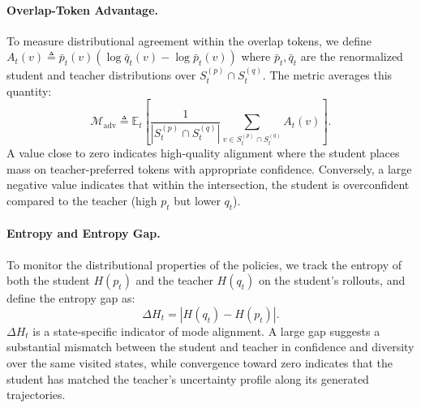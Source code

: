 \paragraph{Overlap-Token Advantage.}
To measure distributional agreement within the overlap tokens,
we define
$A_t(v) \triangleq \bar{p}_t(v)
  (\log \bar{q}_t(v) - \log \bar{p}_t(v))$
where $\bar{p}_t, \bar{q}_t$ are the renormalized student and
teacher distributions over $S_t^{(p)} \cap S_t^{(q)}$.
The metric averages this quantity:
\begin{equation}
  \mathcal{M}_{\text{adv}}
  \triangleq \mathbb{E}_{t}\!\left[
      \frac{1}{|S_t^{(p)} \cap S_t^{(q)}|}
      \sum_{v \in S_t^{(p)} \cap S_t^{(q)}}
        A_t(v)
    \right].
  \label{eq:metric_adv}
\end{equation}
A value close to zero indicates high-quality alignment where the student places mass on teacher-preferred tokens with appropriate confidence. Conversely, a large negative value indicates that within the intersection, the student is overconfident compared to the teacher (high $p_t$ but lower $q_t$).


\paragraph{Entropy and Entropy Gap.}
To monitor the distributional properties of the policies, we track the entropy of both the student $H(p_t)$ and the teacher $H(q_t)$ on the student's rollouts, and define the entropy gap as:
\begin{equation}
\Delta H_t = \left| H(q_t) - H(p_t) \right|.
\label{eq:metric_entropy_gap}
\end{equation}
$\Delta H_t$ is a state-specific indicator of mode alignment.
A large gap suggests a substantial mismatch between the student and teacher in confidence and diversity over the same visited states, while convergence toward zero indicates that the student has matched the teacher's uncertainty profile along its generated trajectories.














































